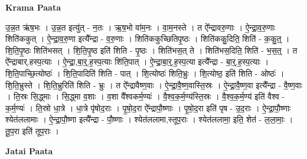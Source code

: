 \documentclass[17pt]{extarticle}
\begin{document}
\textbf{Krama Paata} \newline

उ॒न्न॒त ऋ॑ष॒भः । उ॒न्न॒त इत्यु॑त् - न॒तः । ऋ॒ष॒भो वा॑म॒नः । वा॒म॒नस्ते । त ऐ᳚न्द्रावरु॒णाः । ऐ॒न्द्रा॒व॒रु॒णाः शिति॑ककुत् । ऐ॒न्द्रा॒व॒रु॒णा इत्यै᳚न्द्रा - व॒रु॒णाः । शिति॑ककुच्छितिपृ॒ष्ठः । शिति॑ककु॒दिति॒ शिति॑ - क॒कु॒त्॒ । शि॒ति॒पृ॒ष्ठः शिति॑भसत् । शि॒ति॒पृ॒ष्ठ इति॑ शिति - पृ॒ष्ठः । शिति॑भस॒त् ते । शिति॑भस॒दिति॒ शिति॑ - भ॒स॒त्॒ । त ऐ᳚न्द्राबार्.हस्प॒त्याः । ऐ॒न्द्रा॒,बा॒र्॒.ह॒स्प॒त्याः शि॑ति॒पात् । ऐ॒न्द्रा॒बा॒र्॒.ह॒स्प॒त्या इत्यै᳚न्द्रा - बा॒र्॒.ह॒स्प॒त्याः । शि॒ति॒पाच्छि॒त्योष्ठः॑ । शि॒ति॒पादिति॑ शिति - पात् । शि॒त्योष्ठः॑ शिति॒भ्रुः । शि॒त्योष्ठ॒ इति॑ शिति - ओष्ठः॑ । शि॒ति॒भ्रुस्ते । शि॒ति॒भ्रुरिति॑ शिति - भ्रुः । त ऐ᳚न्द्रावैष्ण॒वाः । ऐ॒न्द्रा॒वै॒ष्ण॒वास्ति॒स्रः । ऐ॒न्द्रा॒वै॒ष्ण॒वा इत्यै᳚न्द्रा - वै॒ष्ण॒वाः । ति॒स्रः सि॒द्ध्माः । सि॒द्ध्मा व॒शाः । व॒शा वै᳚श्वकर्म॒ण्यः॑ । वै॒श्व॒क॒र्म॒ण्य॑स्ति॒स्रः । वै॒श्व॒क॒र्म॒ण्य॑ इति॑ वैश्व - क॒र्म॒ण्यः॑ । ति॒स्रो धा॒त्रे । धा॒त्रे पृ॑षोद॒राः । पृ॒षो॒द॒रा ऐ᳚न्द्रापौ॒ष्णाः । पृ॒षो॒द॒रा इति॑ पृष - उ॒द॒राः । ऐ॒न्द्रा॒पौ॒ष्णाः श्येत॑ललामाः । ऐ॒न्द्रा॒पौ॒ष्णा इत्यै᳚न्द्रा - पौ॒ष्णाः । श्येत॑ललामा,स्तूप॒राः । श्येत॑ललामा॒ इति॒ शेत॑ - ल॒ला॒माः॒ । तू॒प॒रा इति॑ तूप॒राः । \newline

\textbf{Jatai Paata} \newline
\end{document}
